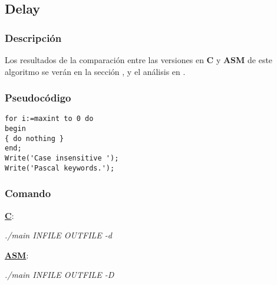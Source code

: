 \subsection{Delay}
\label{subsec:desarrollo-delay}

\subsubsection{Descripción}
\label{subsec:desarrollo-delay-desc}

Los resultados de la comparación entre las versiones en \textbf{C} y \textbf{ASM} de este algoritmo se verán en la sección , y el análisis en .

\subsubsection{Pseudocódigo}
\label{subsec:desarrollo-delay-code}

\lstset{language=C}
\begin{lstlisting}[frame=single]  % Start your code-block
for i:=maxint to 0 do
begin
{ do nothing }
end;
Write('Case insensitive ');
Write('Pascal keywords.');
\end{lstlisting}

\subsubsection{Comando}
\label{subsec:desarrollo-delay-call}

\underline{\textbf{C}}:
\begin{center}
 \textit{./main INFILE OUTFILE -d}
\end{center}

\underline{\textbf{ASM}}:
\begin{center}
 \textit{./main INFILE OUTFILE -D}
\end{center}
